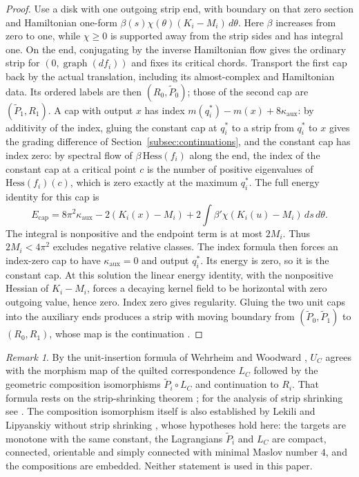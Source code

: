 \documentclass[11pt]{amsart}
\theoremstyle{definition}
\theoremstyle{remark}
\newtheorem{remark}[theorem]{Remark}
\theoremstyle{plain}
\numberwithin{equation}{section}
\begin{document}
\begin{proof}
Use a disk with one outgoing strip end, with
boundary on that zero section and Hamiltonian one-form
$\beta(s)\chi(\theta)(K_i-M_i)\,d\theta$.
Here $\beta$ increases from zero to one, while $\chi\ge0$ is
supported away from the strip sides and has integral one.
On the end, conjugating by the inverse Hamiltonian flow gives
the ordinary strip for $(0,\operatorname{graph}(df_i))$ and fixes
its critical chords. Transport the first cap back by the actual
translation, including its almost-complex and Hamiltonian data.
Its ordered labels are then $(R_0,\widetilde P_0)$; those of the
second cap are $(\widetilde P_1,R_1)$. A cap with output $x$
has index $m(q_i^*)-m(x)+8\kappa_{\mathrm{aux}}$: by additivity of the index, gluing the
constant cap at $q_i^*$ to a strip from $q_i^*$ to $x$ gives the grading
difference of Section~\ref{subsec:continuations}, and the constant cap has
index zero: by spectral flow of $\beta\,\mathrm{Hess}(f_i)$ along the end, the index of the
constant cap at a critical point $c$ is the number of positive eigenvalues of
$\mathrm{Hess}(f_i)(c)$, which is zero exactly at the maximum $q_i^*$. The full energy identity for this cap is
\[
E_{\mathrm{cap}}=8\pi^2\kappa_{\mathrm{aux}}
 -2(K_i(x)-M_i)
 +2\int\beta'\chi(K_i(u)-M_i)\,ds\,d\theta.
\]
The integral is nonpositive and the endpoint term is at most
$2M_i$. Thus $2M_i<4\pi^2$ excludes negative relative classes.
The index formula then forces an index-zero cap to have
$\kappa_{\mathrm{aux}}=0$ and output $q_i^*$. Its energy is
zero, so it is the constant cap. At this solution the linear
energy identity, with the nonpositive Hessian of $K_i-M_i$,
forces a decaying kernel field to be horizontal with zero
outgoing value, hence zero. Index zero gives regularity.
Gluing
the two unit caps into the auxiliary ends \cite[Theorem~3.13]{WW-relative}
produces a strip with moving boundary from
$(\widetilde P_0,\widetilde P_1)$ to $(R_0,R_1)$, whose map is the continuation
\cite[Theorem~4.1, Example~2.6]{WW-relative}.
\end{proof}


\begin{remark}\label{rem:quilted-cup}
By the unit-insertion formula of Wehrheim and Woodward
\cite[Corollary~5.5]{WW-relative}, $U_C$ agrees with the morphism map of the
quilted correspondence $L_C$ \cite{WW-quilt} followed by the geometric
composition isomorphisms $\widetilde P_i\circ L_C$ and continuation to $R_i$.
That formula rests on the strip-shrinking theorem
\cite[Theorem~5.1]{WW-relative}; for the analysis of strip shrinking see
\cite{WW-composition, BW-squiggly}. The
composition isomorphism itself is also established by Lekili and Lipyanskiy
without strip shrinking \cite[Theorem~2 and Corrigendum,
Remark~1(1)]{LL-composition}, whose hypotheses hold here: the targets are
monotone with the same constant, the Lagrangians $\widetilde P_i$ and $L_C$ are
compact, connected, orientable and simply connected with minimal Maslov
number $4$, and the compositions are embedded. Neither statement is used in
this paper.
\end{remark}
\end{document}
